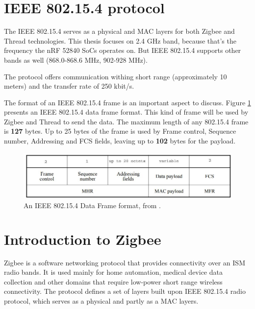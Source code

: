 
\section{IEEE 802.15.4 protocol}

The IEEE 802.15.4 serves as a physical and MAC layers for both Zigbee and Thread 
technologies. This thesis focuses on 2.4 GHz band, because that's the frequency 
the nRF 52840 SoCs operates on. But IEEE 802.15.4 supports other bands as well 
(868.0-868.6 MHz, 902-928 MHz)\cite{802154_wikipedia}.

The protocol offers communication withing short range (approximately 10 meters) 
and the transfer rate of 250 kbit/s.

The format of an IEEE 802.15.4 frame is an important aspect to discuss. Figure \ref{fig:ieee802154_frame} presents an IEEE 802.15.4 data frame format. This kind
of frame will be used by Zigbee and Thread to send the data. The maximum length
of any 802.15.4 frame is \textbf{127} bytes. Up to 25 bytes of the frame is 
used by Frame control, Sequence number, Addressing and FCS fields, leaving up
to \textbf{102} bytes for the payload.

\begin{figure}[H]
    \centering
    \includegraphics[scale=0.52]{images/ieee-802154-frame.jpg}
    \caption{An IEEE 802.15.4 Data Frame format, from \cite{802154_spec}.}
    \label{fig:ieee802154_frame}
\end{figure}

\section{Introduction to Zigbee}
\label{sec:IntroToZigbee}

Zigbee is a software networking protocol that provides connectivity over
an ISM radio bands. It is used mainly for home automation, medical device data collection and other domains that require low-power short range
wireless connectivity. The protocol defines a set of layers built upon IEEE 802.15.4
radio protocol, which serves as a physical and partly as a MAC 
layers\cite{ZigbeeSpecification}\cite{ZigbeeWikipedia}.

